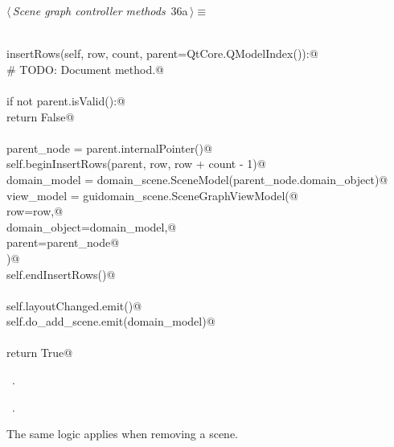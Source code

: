 \documentclass[
    a4paper,      %
    10pt,         %
    openright,    %
    notitlepage,  %
    parskip=half, %
]{scrreprt}       %
\theoremstyle{definition}                    %
\begin{document}
\begin{flushleft} \small
\begin{minipage}{\linewidth}\label{scrap42}\raggedright\small
{} $\langle\,${\itshape Scene graph controller methods}\nobreak\ {\footnotesize {36a}}$\,\rangle\equiv$
\vspace{-1ex}
\begin{list}{}{} \item
\mbox{}\lstinline@@\\
\mbox{}\lstinline@def insertRows(self, row, count, parent=QtCore.QModelIndex()):@\\
\mbox{}\lstinline@    # TODO: Document method.@\\
\mbox{}\lstinline@@\\
\mbox{}\lstinline@    if not parent.isValid():@\\
\mbox{}\lstinline@        return False@\\
\mbox{}\lstinline@@\\
\mbox{}\lstinline@    parent_node = parent.internalPointer()@\\
\mbox{}\lstinline@    self.beginInsertRows(parent, row, row + count - 1)@\\
\mbox{}\lstinline@    domain_model  = domain_scene.SceneModel(parent_node.domain_object)@\\
\mbox{}\lstinline@    view_model = guidomain_scene.SceneGraphViewModel(@\\
\mbox{}\lstinline@        row=row,@\\
\mbox{}\lstinline@        domain_object=domain_model,@\\
\mbox{}\lstinline@        parent=parent_node@\\
\mbox{}\lstinline@    )@\\
\mbox{}\lstinline@    self.endInsertRows()@\\
\mbox{}\lstinline@@\\
\mbox{}\lstinline@    self.layoutChanged.emit()@\\
\mbox{}\lstinline@    self.do_add_scene.emit(domain_model)@\\
\mbox{}\lstinline@@\\
\mbox{}\lstinline@    return True@\\
\mbox{}\lstinline@@{\NWsep}
\end{list}
\vspace{-1.5ex}
\footnotesize
\begin{list}{}{\setlength{\itemsep}{-\parsep}\setlength{\itemindent}{-\leftmargin}}
\item \NWtxtMacroDefBy\ .
\item \NWtxtMacroRefIn\ .

\item{}
\end{list}
\end{minipage}\vspace{4ex}
\end{flushleft}
The same logic applies when removing a scene.
\end{document}
